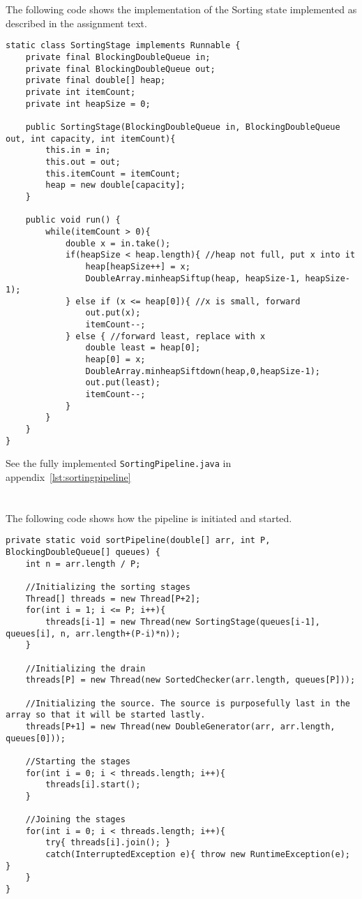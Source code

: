 \documentclass{ituhandin}
\begin{document}
\section{}
The following code shows the implementation of the Sorting state implemented as described in the assignment text.
\begin{lstlisting}[caption=Implemented code for the Sorting stage]
static class SortingStage implements Runnable {
    private final BlockingDoubleQueue in;
    private final BlockingDoubleQueue out;
    private final double[] heap; 
    private int itemCount;
    private int heapSize = 0;

    public SortingStage(BlockingDoubleQueue in, BlockingDoubleQueue out, int capacity, int itemCount){
        this.in = in;
        this.out = out;
        this.itemCount = itemCount;
        heap = new double[capacity];
    }

    public void run() { 
        while(itemCount > 0){
            double x = in.take();
            if(heapSize < heap.length){ //heap not full, put x into it
                heap[heapSize++] = x;
                DoubleArray.minheapSiftup(heap, heapSize-1, heapSize-1);
            } else if (x <= heap[0]){ //x is small, forward
                out.put(x);
                itemCount--;
            } else { //forward least, replace with x
                double least = heap[0];
                heap[0] = x;
                DoubleArray.minheapSiftdown(heap,0,heapSize-1);
                out.put(least);
                itemCount--;
            }
        }
    }
}
\end{lstlisting}
See the fully implemented \texttt{SortingPipeline.java} in appendix~\ref{lst:sortingpipeline} 
\newpage
\section{}
The following code shows how the pipeline is initiated and started.
\begin{lstlisting}[caption=Implemented code for setting up and starting stages]
private static void sortPipeline(double[] arr, int P, BlockingDoubleQueue[] queues) {
    int n = arr.length / P;

    //Initializing the sorting stages
    Thread[] threads = new Thread[P+2];
    for(int i = 1; i <= P; i++){
        threads[i-1] = new Thread(new SortingStage(queues[i-1], queues[i], n, arr.length+(P-i)*n)); 
    }

    //Initializing the drain
    threads[P] = new Thread(new SortedChecker(arr.length, queues[P]));

    //Initializing the source. The source is purposefully last in the array so that it will be started lastly.
    threads[P+1] = new Thread(new DoubleGenerator(arr, arr.length, queues[0]));

    //Starting the stages
    for(int i = 0; i < threads.length; i++){
        threads[i].start();
    }

    //Joining the stages
    for(int i = 0; i < threads.length; i++){
        try{ threads[i].join(); }
        catch(InterruptedException e){ throw new RuntimeException(e); }
    }
}
\end{lstlisting}
\end{document}
